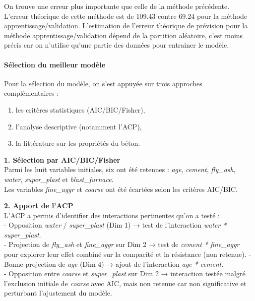 \documentclass[
  12pt,
]{article}
\providecommand{\tightlist}{%
  \setlength{\itemsep}{0pt}\setlength{\parskip}{0pt}}
\begin{document}
On trouve une erreur plus importante que celle de la méthode précédente.
L'erreur théorique de cette méthode est de 109.43 contre 69.24 pour la
méthode apprentissage/validation. L'estimation de l'erreur théorique de
prévision pour la méthode apprentissage/validation dépend de la
partition aléatoire, c'est moins précis car on n'utilise qu'une partie
des données pour entrainer le modèle.

\paragraph{Sélection du meilleur
modèle}\label{suxe9lection-du-meilleur-moduxe8le}

Pour la sélection du modèle, on s'est appuyée sur trois approches
complémentaires :

\begin{enumerate}
\def\labelenumi{\arabic{enumi}.}
\tightlist
\item
  les critères statistiques (AIC/BIC/Fisher),\\
\item
  l'analyse descriptive (notamment l'ACP),\\
\item
  la littérature sur les propriétés du béton.
\end{enumerate}

\textbf{1. Sélection par AIC/BIC/Fisher}\\
Parmi les huit variables initiales, six ont été retenues : \emph{age},
\emph{cement}, \emph{fly\_ash}, \emph{water}, \emph{super\_plast} et
\emph{blast\_furnace}.\\
Les variables \emph{fine\_aggr} et \emph{coarse} ont été écartées selon
les critères AIC/BIC.

\textbf{2. Apport de l'ACP}\\
L'ACP a permis d'identifier des interactions pertinentes qu'on a testé
:\\
- Opposition \emph{water} / \emph{super\_plast} (Dim 1) → test de
l'interaction \emph{water * super\_plast}.\\
- Projection de \emph{fly\_ash} et \emph{fine\_aggr} sur Dim 2 → test de
\emph{cement * fine\_aggr} pour explorer leur effet combiné sur la
compacité et la résistance (non retenue). - Bonne projection de
\emph{age} (Dim 4) → ajout de l'interaction \emph{age * cement}.\\
- Opposition entre \emph{coarse} et \emph{super\_plast} sur Dim 2 →
interaction testée malgré l'exclusion initiale de \emph{coarse} avec
AIC, mais non retenue car non significative et perturbant l'ajustement
du modèle.
\end{document}
